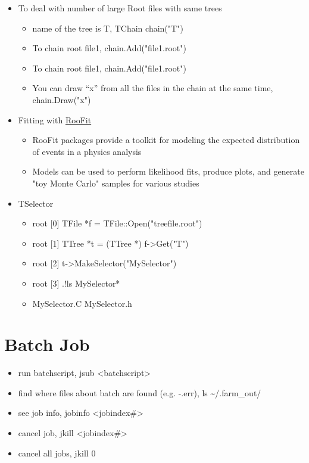\documentclass[11pt]{article}
\begin{document}
\begin{itemize}
\item To deal with number of large Root files with same trees
\begin{itemize}
\item name of the tree is T, TChain chain("T")
\item To chain root file1, chain.Add("file1.root")
\item To chain root file1, chain.Add("file1.root")
\item You can draw “x” from all the files in the chain at the same time, chain.Draw("x")
\end{itemize}
\item Fitting with \href{http://roofit.sourceforge.net/}{RooFit}
\begin{itemize}
\item RooFit packages provide a toolkit for modeling the expected distribution of events in a physics analysis
\item Models can be used to perform likelihood fits, produce plots, and generate "toy Monte Carlo" samples for various studies
\end{itemize}
\item TSelector
\begin{itemize}
\item root [0] TFile *f = TFile::Open("treefile.root")
\item root [1] TTree *t = (TTree *) f->Get("T")
\item root [2] t->MakeSelector("MySelector")
\item root [3] .!ls MySelector*
\item MySelector.C  MySelector.h
\end{itemize}
\end{itemize}
\section{Batch Job}
\label{sec:org4ef413f}
\begin{itemize}
\item run batchscript, jsub <batchscript>
\item find where files about batch are found (e.g. -.err), ls \textasciitilde{}/.farm\_out/
\item see job info, jobinfo <jobindex\#>
\item cancel job, jkill <jobindex\#>
\item cancel all jobs, jkill 0
\end{itemize}
\end{document}
